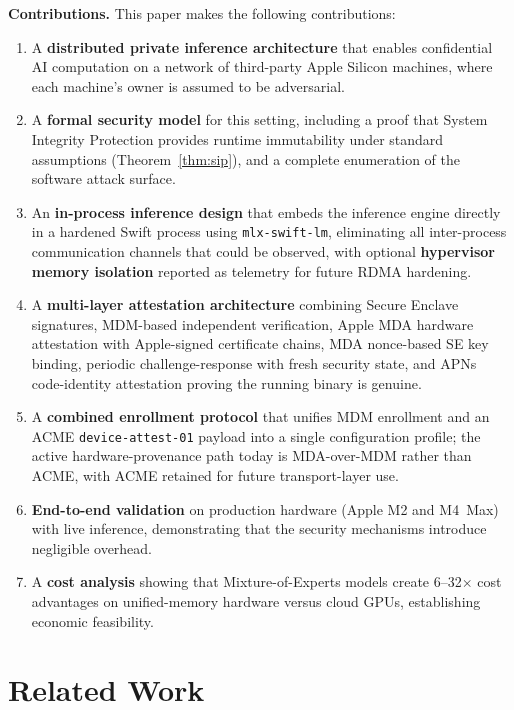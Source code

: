 \documentclass[10pt,twocolumn,letterpaper]{article}
\begin{document}
\textbf{Contributions.} This paper makes the following contributions:
\begin{enumerate}[leftmargin=*,itemsep=2pt,topsep=2pt]
    \item A \textbf{distributed private inference architecture} that enables confidential AI computation on a network of third-party Apple Silicon machines, where each machine's owner is assumed to be adversarial.
    \item A \textbf{formal security model} for this setting, including a proof that System Integrity Protection provides runtime immutability under standard assumptions (Theorem~\ref{thm:sip}), and a complete enumeration of the software attack surface.
    \item An \textbf{in-process inference design} that embeds the inference engine directly in a hardened Swift process using \texttt{mlx-swift-lm}, eliminating all inter-process communication channels that could be observed, with optional \textbf{hypervisor memory isolation} reported as telemetry for future RDMA hardening.
    \item A \textbf{multi-layer attestation architecture} combining Secure Enclave signatures, MDM-based independent verification, Apple MDA hardware attestation with Apple-signed certificate chains, MDA nonce-based SE key binding, periodic challenge-response with fresh security state, and APNs code-identity attestation proving the running binary is genuine.
    \item A \textbf{combined enrollment protocol} that unifies MDM enrollment and an ACME \texttt{device-attest-01} payload into a single configuration profile; the active hardware-provenance path today is MDA-over-MDM rather than ACME, with ACME retained for future transport-layer use.
    \item \textbf{End-to-end validation} on production hardware (Apple M2 and M4~Max) with live inference, demonstrating that the security mechanisms introduce negligible overhead.
    \item A \textbf{cost analysis} showing that Mixture-of-Experts models create 6--32$\times$ cost advantages on unified-memory hardware versus cloud GPUs, establishing economic feasibility.
\end{enumerate}

\section{Related Work}
\label{sec:related}
\end{document}

